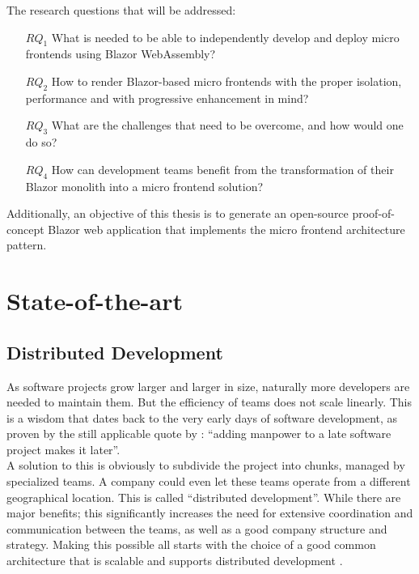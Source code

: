 \begin{minipage}{\linewidth} %
     The research questions that will be addressed:
    \begin{itemize}
        \item[$RQ_1$] What is needed to be able to independently develop and
        deploy micro frontends using Blazor WebAssembly?
        \item[$RQ_2$] How to render Blazor-based micro frontends with the proper
        isolation, performance and with progressive enhancement in mind?
        \item[$RQ_3$] What are the challenges that need to be overcome, and how
        would one do so? 
        \item[$RQ_4$] How can development teams benefit from the transformation
        of their Blazor monolith into a micro frontend solution?
    \end{itemize}
\end{minipage}

\blankline
Additionally, an objective of this thesis is to generate an open-source
proof-of-concept Blazor web application that implements the micro frontend
architecture pattern.




\section{State-of-the-art}
\label{sec:state-of-the-art}

\subsection{Distributed Development}
As software projects grow larger and larger in size, naturally more developers
are needed to maintain them. But the efficiency of teams does not scale
linearly. This is a wisdom that dates back to the very early days of software
development, as proven by the still applicable quote by \textcite{Brooks_1975}:
``adding manpower to a late software project makes it later''.\\
A solution to this is obviously to subdivide the project into chunks, managed by
specialized teams. A company could even let these teams operate from a different
geographical location. This is called ``distributed development''. While there
are major benefits; this significantly increases the need for extensive
coordination and communication between the teams, as well as a good company
structure and strategy. Making this possible all starts with the choice of a
good common architecture that is scalable and supports distributed development
\autocite{Yuhong_2008}. 

